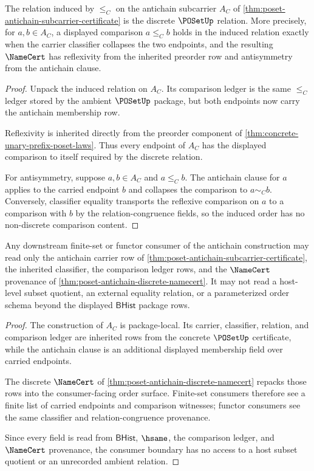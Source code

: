 \begin{theorem}
\label{thm:poset-antichain-discrete-namecert}
The relation induced by $\le_C$ on the antichain subcarrier
$A_C$ of \autoref{thm:poset-antichain-subcarrier-certificate} is the discrete
$\POSetUp$ relation. More precisely, for $a,b\in A_C$, a displayed comparison
$a\le_C b$ holds in the induced relation exactly when the carrier classifier
collapses the two endpoints, and the resulting $\NameCert$ has reflexivity
from the inherited preorder row and antisymmetry from the antichain clause.
\end{theorem}
\begin{proof}
Unpack the induced relation on $A_C$. Its comparison ledger is the same
$\le_C$ ledger stored by the ambient $\POSetUp$ package, but both endpoints now
carry the antichain membership row.

Reflexivity is inherited directly from the preorder component of
\autoref{thm:concrete-unary-prefix-poset-laws}. Thus every endpoint of $A_C$
has the displayed comparison to itself required by the discrete relation.

For antisymmetry, suppose $a,b\in A_C$ and $a\le_C b$. The antichain clause for
$a$ applies to the carried endpoint $b$ and collapses the comparison to
$a\sim_C b$. Conversely, classifier equality transports the reflexive
comparison on $a$ to a comparison with $b$ by the relation-congruence fields,
so the induced order has no non-discrete comparison content.
\end{proof}

\begin{theorem}
\label{thm:poset-antichain-functor-consumer-boundary}
Any downstream finite-set or functor consumer of the antichain construction may
read only the antichain carrier row of
\autoref{thm:poset-antichain-subcarrier-certificate}, the inherited classifier,
the comparison ledger rows, and the $\NameCert$ provenance of
\autoref{thm:poset-antichain-discrete-namecert}. It may not read a host-level
subset quotient, an external equality relation, or a parameterized order
schema beyond the displayed $\mathsf{BHist}$ package rows.
\end{theorem}
\begin{proof}
The construction of $A_C$ is package-local. Its carrier, classifier, relation,
and comparison ledger are inherited rows from the concrete $\POSetUp$
certificate, while the antichain clause is an additional displayed membership
field over carried endpoints.

The discrete $\NameCert$ of
\autoref{thm:poset-antichain-discrete-namecert} repacks those rows into the
consumer-facing order surface. Finite-set consumers therefore see a finite
list of carried endpoints and comparison witnesses; functor consumers see the
same classifier and relation-congruence provenance.

Since every field is read from $\mathsf{BHist}$, $\hsame$, the comparison
ledger, and $\NameCert$ provenance, the consumer boundary has no access to a
host subset quotient or an unrecorded ambient relation.
\end{proof}

